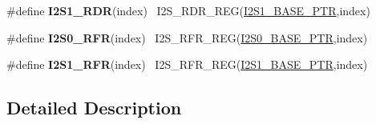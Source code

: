 \begin{DoxyCompactItemize}
\item 
\hypertarget{group___i2_s___register___accessor___macros_ga7c0f3bea08efe3d3e57571a722de08c2}{}\#define {\bfseries I2\+S1\+\_\+\+R\+D\+R}(index)                                                ~I2\+S\+\_\+\+R\+D\+R\+\_\+\+R\+E\+G(\hyperlink{group___i2_s___peripheral_ga1a9b2077128eb723b292b14fea26b83f}{I2\+S1\+\_\+\+B\+A\+S\+E\+\_\+\+P\+T\+R},index)\label{group___i2_s___register___accessor___macros_ga7c0f3bea08efe3d3e57571a722de08c2}

\item 
\hypertarget{group___i2_s___register___accessor___macros_gab54d7c82666015d70bab5044fb12ef6d}{}\#define {\bfseries I2\+S0\+\_\+\+R\+F\+R}(index)                                                ~I2\+S\+\_\+\+R\+F\+R\+\_\+\+R\+E\+G(\hyperlink{group___i2_s___peripheral_ga2eac5d85244610150239927c71b2e147}{I2\+S0\+\_\+\+B\+A\+S\+E\+\_\+\+P\+T\+R},index)\label{group___i2_s___register___accessor___macros_gab54d7c82666015d70bab5044fb12ef6d}

\item 
\hypertarget{group___i2_s___register___accessor___macros_ga8d00cda270fad7771a6f81a9eb2ea638}{}\#define {\bfseries I2\+S1\+\_\+\+R\+F\+R}(index)                                                ~I2\+S\+\_\+\+R\+F\+R\+\_\+\+R\+E\+G(\hyperlink{group___i2_s___peripheral_ga1a9b2077128eb723b292b14fea26b83f}{I2\+S1\+\_\+\+B\+A\+S\+E\+\_\+\+P\+T\+R},index)\label{group___i2_s___register___accessor___macros_ga8d00cda270fad7771a6f81a9eb2ea638}

\end{DoxyCompactItemize}


\subsection{Detailed Description}
